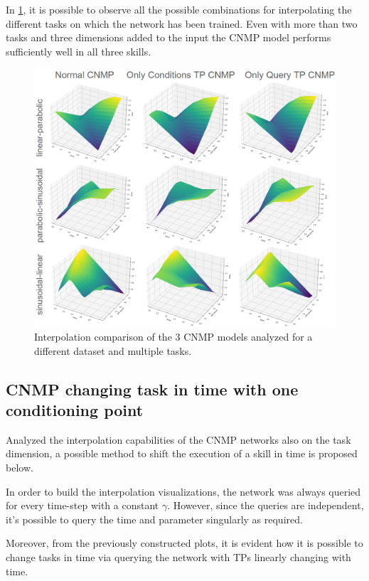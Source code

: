 In \cref{fig:comparisonCNMP3trajectories}, it is possible to observe all the possible combinations for interpolating the different tasks on which the network has been trained. Even with more than two tasks and three dimensions added to the input the CNMP model performs sufficiently well in all three skills. 

\begin{figure}
    \centering
    \includegraphics[width=0.9\linewidth]{figures/comparisonCNMP3trajectories.png}
    \caption{ Interpolation comparison of the 3 CNMP models analyzed for a different dataset and multiple tasks. }
    \label{fig:comparisonCNMP3trajectories}
\end{figure}


\newpage
\subsection{CNMP changing task in time with one conditioning point}
Analyzed the interpolation capabilities of the CNMP networks also on the task dimension, a possible method to shift the execution of a skill in time is proposed below. 

In order to build the interpolation visualizations, the network was always queried for every time-step with a constant $\gamma$. 
However, since the queries are independent, it's possible to query the time and parameter singularly as required.

Moreover, from the previously constructed plots, it is evident how it is possible to change tasks in time via querying the network with TPs linearly changing with time.

